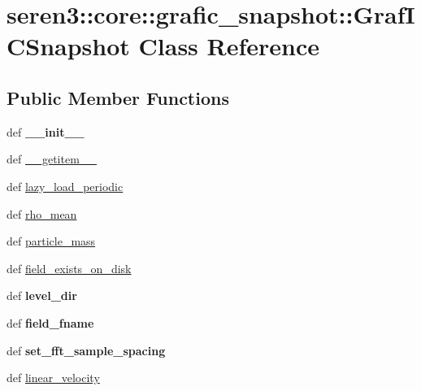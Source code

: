 \hypertarget{classseren3_1_1core_1_1grafic__snapshot_1_1GrafICSnapshot}{
\section{seren3::core::grafic\_\-snapshot::GrafICSnapshot Class Reference}
\label{classseren3_1_1core_1_1grafic__snapshot_1_1GrafICSnapshot}
}
\subsection*{Public Member Functions}
\begin{DoxyCompactItemize}
\item 
\hypertarget{classseren3_1_1core_1_1grafic__snapshot_1_1GrafICSnapshot_a3f9b5753f3cfc6d3239c6d4c86627e9d}{
def {\bfseries \_\-\_\-init\_\-\_\-}}
\label{classseren3_1_1core_1_1grafic__snapshot_1_1GrafICSnapshot_a3f9b5753f3cfc6d3239c6d4c86627e9d}

\item 
def \hyperlink{classseren3_1_1core_1_1grafic__snapshot_1_1GrafICSnapshot_a8a8630ab2ce317db7548e295b0d64d3d}{\_\-\_\-getitem\_\-\_\-}
\item 
def \hyperlink{classseren3_1_1core_1_1grafic__snapshot_1_1GrafICSnapshot_a4cc2a0f15619694e65c70c5cd56c3dd8}{lazy\_\-load\_\-periodic}
\item 
def \hyperlink{classseren3_1_1core_1_1grafic__snapshot_1_1GrafICSnapshot_a5ef8f9c0a37a0afb78eadad29e1ded2a}{rho\_\-mean}
\item 
def \hyperlink{classseren3_1_1core_1_1grafic__snapshot_1_1GrafICSnapshot_af4a26de0162d63e72e4b95b37dde0653}{particle\_\-mass}
\item 
def \hyperlink{classseren3_1_1core_1_1grafic__snapshot_1_1GrafICSnapshot_af3a25d2951a2e8e6349eae67606a2fb5}{field\_\-exists\_\-on\_\-disk}
\item 
\hypertarget{classseren3_1_1core_1_1grafic__snapshot_1_1GrafICSnapshot_a41dfacd59faec44bff61476aaf8a4470}{
def {\bfseries level\_\-dir}}
\label{classseren3_1_1core_1_1grafic__snapshot_1_1GrafICSnapshot_a41dfacd59faec44bff61476aaf8a4470}

\item 
\hypertarget{classseren3_1_1core_1_1grafic__snapshot_1_1GrafICSnapshot_a8f84428887fe95f10d3ebe83ffd329a3}{
def {\bfseries field\_\-fname}}
\label{classseren3_1_1core_1_1grafic__snapshot_1_1GrafICSnapshot_a8f84428887fe95f10d3ebe83ffd329a3}

\item 
\hypertarget{classseren3_1_1core_1_1grafic__snapshot_1_1GrafICSnapshot_af75806a767e191d3514642af809a227a}{
def {\bfseries set\_\-fft\_\-sample\_\-spacing}}
\label{classseren3_1_1core_1_1grafic__snapshot_1_1GrafICSnapshot_af75806a767e191d3514642af809a227a}

\item 
def \hyperlink{classseren3_1_1core_1_1grafic__snapshot_1_1GrafICSnapshot_aad4bf2ecaf6f4f9dd009090af1d8935f}{linear\_\-velocity}
\end{DoxyCompactItemize}
